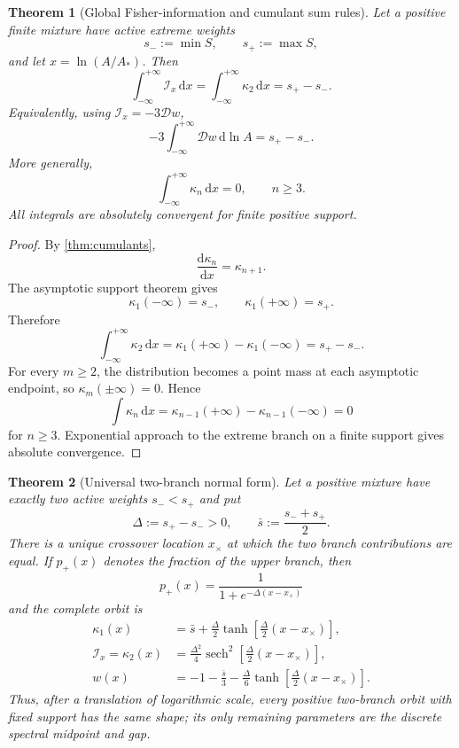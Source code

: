 \documentclass[aps,prd,reprint,onecolumn,nofootinbib,superscriptaddress,showkeys]{revtex4-2}
\numberwithin{equation}{section}
\theoremstyle{definition}
\theoremstyle{plain}
\newtheorem{theorem}{Theorem}[section]
\newcommand{\dd}{\mathrm d}
\newcommand{\Dil}{\mathscr D}
\begin{document}
\begin{theorem}[Global Fisher-information and cumulant sum rules]\label{thm:fisher-sumrule}
Let a positive finite mixture have active extreme weights
\[
s_-:=\min S,\qquad s_+:=\max S,
\]
and let $x=\ln(A/A_*)$.  Then
\begin{equation}
\boxed{
\int_{-\infty}^{+\infty}\mathcal I_x\,\dd x
=
\int_{-\infty}^{+\infty}\kappa_2\,\dd x
=
s_+-s_-.
}
\end{equation}
Equivalently, using $\mathcal I_x=-3\Dil w$,
\begin{equation}
\boxed{
-3\int_{-\infty}^{+\infty}\Dil w\,\dd\ln A
=
s_+-s_-.
}
\end{equation}
More generally,
\begin{equation}
\boxed{
\int_{-\infty}^{+\infty}\kappa_n\,\dd x=0,
\qquad n\ge3.
}
\end{equation}
All integrals are absolutely convergent for finite positive support.
\end{theorem}

\begin{proof}
By \cref{thm:cumulants},
\[
\frac{\dd\kappa_n}{\dd x}=\kappa_{n+1}.
\]
The asymptotic support theorem gives
\[
\kappa_1(-\infty)=s_-,
\qquad
\kappa_1(+\infty)=s_+.
\]
Therefore
\[
\int_{-\infty}^{+\infty}\kappa_2\,\dd x
=
\kappa_1(+\infty)-\kappa_1(-\infty)
=
s_+-s_-.
\]
For every $m\ge2$, the distribution becomes a point mass at each asymptotic endpoint, so $\kappa_m(\pm\infty)=0$.  Hence
\[
\int\kappa_n\,\dd x
=
\kappa_{n-1}(+\infty)-\kappa_{n-1}(-\infty)=0
\]
for $n\ge3$.  Exponential approach to the extreme branch on a finite support gives absolute convergence.
\end{proof}

\begin{theorem}[Universal two-branch normal form]\label{thm:two-branch-normal-form}
Let a positive mixture have exactly two active weights $s_-<s_+$ and put
\[
\Delta:=s_+-s_->0,
\qquad
\bar s:=\frac{s_-+s_+}{2}.
\]
There is a unique crossover location $x_\times$ at which the two branch contributions are equal.  If $p_+(x)$ denotes the fraction of the upper branch, then
\begin{equation}
\boxed{
p_+(x)=\frac{1}{1+e^{-\Delta(x-x_\times)}}
}
\end{equation}
and the complete orbit is
\begin{equation}
\boxed{
\begin{aligned}
\kappa_1(x)
&=\bar s+\frac{\Delta}{2}\tanh\!\left[\frac{\Delta}{2}(x-x_\times)\right],\\
\mathcal I_x=\kappa_2(x)
&=\frac{\Delta^2}{4}\operatorname{sech}^2\!\left[\frac{\Delta}{2}(x-x_\times)\right],\\
w(x)
&=-1-\frac{\bar s}{3}-\frac{\Delta}{6}\tanh\!\left[\frac{\Delta}{2}(x-x_\times)\right].
\end{aligned}
}
\end{equation}
Thus, after a translation of logarithmic scale, every positive two-branch orbit with fixed support has the same shape; its only remaining parameters are the discrete spectral midpoint and gap.
\end{theorem}
\end{document}
